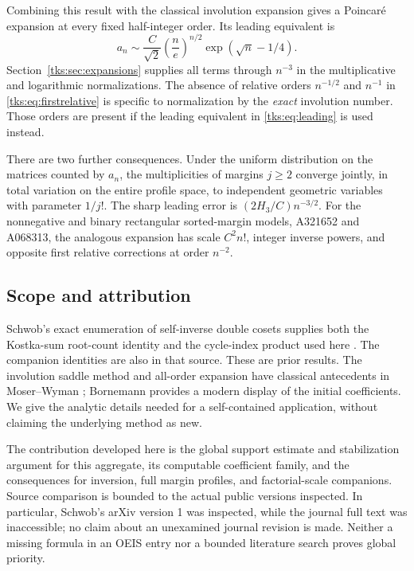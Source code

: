 Combining this result with the classical involution expansion gives a Poincar\'e expansion at every fixed half-integer order. Its leading equivalent is
\begin{equation}\label{tks:eq:leading}
a_n\sim \frac{C}{\sqrt2}\left(\frac ne\right)^{n/2}
                   \exp(\sqrt n-1/4).
\end{equation}
Section~\ref{tks:sec:expansions} supplies all terms through $n^{-3}$ in the multiplicative and logarithmic normalizations. The absence of relative orders $n^{-1/2}$ and $n^{-1}$ in \eqref{tks:eq:firstrelative} is specific to normalization by the \emph{exact} involution number. Those orders are present if the leading equivalent in \eqref{tks:eq:leading} is used instead.

There are two further consequences. Under the uniform distribution on the matrices counted by $a_n$, the multiplicities of margins $j\geq2$ converge jointly, in total variation on the entire profile space, to independent geometric variables with parameter $1/j!$. The sharp leading error is $(2H_3/C)n^{-3/2}$. For the nonnegative and binary rectangular sorted-margin models, A321652 and A068313, the analogous expansion has scale $C^2n!$, integer inverse powers, and opposite first relative corrections at order $n^{-2}$.

\subsection{Scope and attribution}
Schwob's exact enumeration of self-inverse double cosets supplies both the Kostka-sum root-count identity and the cycle-index product used here \cite[\S4.3, (4.5)--(4.8)]{Schwob}. The companion identities are also in that source. These are prior results. The involution saddle method and all-order expansion have classical antecedents in Moser--Wyman \cite{MW1955,MW1956}; Bornemann \cite[Appendix C]{Bornemann} provides a modern display of the initial coefficients. We give the analytic details needed for a self-contained application, without claiming the underlying method as new.

The contribution developed here is the global support estimate and stabilization argument for this aggregate, its computable coefficient family, and the consequences for inversion, full margin profiles, and factorial-scale companions. Source comparison is bounded to the actual public versions inspected. In particular, Schwob's arXiv version 1 was inspected, while the journal full text was inaccessible; no claim about an unexamined journal revision is made. Neither a missing formula in an OEIS entry nor a bounded literature search proves global priority.

